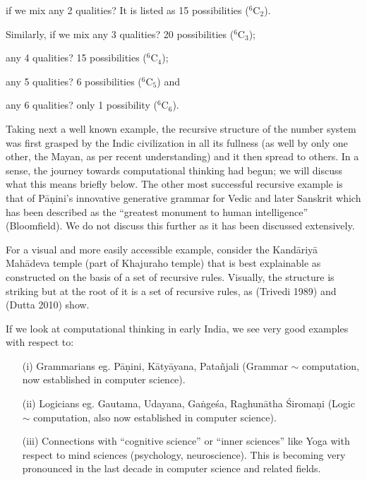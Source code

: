 {\begin{myquote}
if we mix any 2 qualities? It is listed as 15 possibilities ($^{6}$C$_{2}$).

Similarly, if we mix any 3 qualities? 20 possibilities ($^{6}$C$_{3}$);

any 4 qualities? 15 possibilities ($^{6}$C$_{4}$);

any 5 qualities? 6 possibilities ($^{6}$C$_{5}$) and

any 6 qualities? only 1 possibility ($^{6}$C$_{6}$).
\end{myquote}

\newpage

Taking next a well known example, the recursive structure of the number system was first grasped by the Indic civilization in all its fullness (as well by only one other, the Mayan, as per recent understanding) and it then spread to others. In a sense, the journey towards computational thinking had begun; we will discuss what this means briefly below. The other most successful recursive example is that of Pāṇini’s innovative generative grammar for Vedic and later Sanskrit which has been described as the “greatest monument to human intelligence” (Bloomfield). We do not discuss this further as it has been discussed extensively.

For a visual and more easily accessible example, consider the Kandāriyā Mahādeva temple (part of Khajuraho temple) that is best explainable as constructed on the basis of a set of recursive rules. Visually, the structure is striking but at the root of it is a set of recursive rules, as (Trivedi 1989) and (Dutta 2010) show.

If we look at computational thinking in early India, we see very good examples with respect to:
\begin{itemize}
\itemsep=2pt
\item[(i)] Grammarians eg. Pāṇini, Kātyāyana, Patañjali (Grammar $\sim$ computation, now established in computer science).

\item[(ii)] Logicians eg. Gautama, Udayana, Gaṅgeśa, Raghunātha Śiromaṇi (Logic $\sim$ computation, also now established in computer science).

\item[(iii)] Connections with “cognitive science” or “inner sciences” like Yoga with respect to mind sciences (psychology, neuroscience). This is becoming very pronounced in the last decade in computer science and related fields.
\end{itemize}

}
